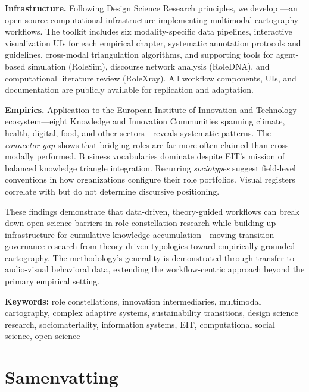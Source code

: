 \documentclass[../main.tex]{subfiles}
\begin{document}
\textbf{Infrastructure.} Following Design Science Research principles, we develop \RoleBox---an open-source computational infrastructure implementing multimodal cartography workflows. The toolkit includes six modality-specific data pipelines, interactive visualization UIs for each empirical chapter, systematic annotation protocols and guidelines, cross-modal triangulation algorithms, and supporting tools for agent-based simulation (RoleSim), discourse network analysis (RoleDNA), and computational literature review (RoleXray). All workflow components, UIs, and documentation are publicly available for replication and adaptation.

\textbf{Empirics.} Application to the European Institute of Innovation and Technology ecosystem---eight Knowledge and Innovation Communities spanning climate, health, digital, food, and other sectors---reveals systematic patterns. The \textit{connector gap} shows that bridging roles are far more often claimed than cross-modally performed. Business vocabularies dominate despite EIT's mission of balanced knowledge triangle integration. Recurring \textit{sociotypes} suggest field-level conventions in how organizations configure their role portfolios. Visual registers correlate with but do not determine discursive positioning.

These findings demonstrate that data-driven, theory-guided workflows can break down open science barriers in role constellation research while building up infrastructure for cumulative knowledge accumulation---moving transition governance research from theory-driven typologies toward empirically-grounded cartography. The methodology's generality is demonstrated through transfer to audio-visual behavioral data, extending the workflow-centric approach beyond the primary empirical setting.

\vspace{0.3cm}

\noindent\textbf{Keywords:} role constellations, innovation intermediaries, multimodal cartography, complex adaptive systems, sustainability transitions, design science research, sociomateriality, information systems, EIT, computational social science, open science

\vspace{1.5cm}

\chapter*{Samenvatting}
\end{document}
